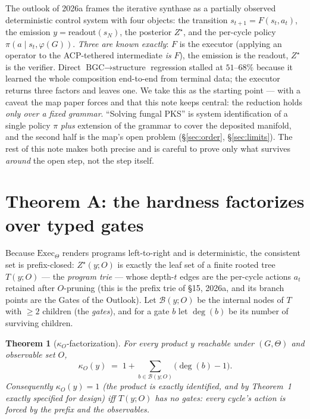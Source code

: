 \documentclass[11pt]{article}
\theoremstyle{plain}
\newtheorem{theorem}{Theorem}
\theoremstyle{definition}
\newcommand{\Exec}{\mathrm{Exec}}
\newcommand{\Zstar}{Z^{\star}}
\newcommand{\kO}{\kappa_{O}}
\newcommand{\Gates}{\mathcal{B}}
\newcommand{\Defn}[1]{\emph{#1}}
\begin{document}
The outlook of 2026a frames the iterative synthase as a partially observed deterministic control system with four objects: the transition $s_{t+1}=F(s_t,a_t)$, the emission $y=\mathrm{readout}(s_N)$, the posterior $\Zstar$, and the per-cycle policy $\pi(a\mid s_t,\varphi(G))$. \emph{Three are known exactly}: $F$ is the executor (applying an operator to the ACP-tethered intermediate \emph{is} $F$), the emission is the readout, $\Zstar$ is the verifier. Direct $\text{BGC}\!\to\!\text{structure}$ regression stalled at $51\text{--}68\%$ because it learned the whole composition end-to-end from terminal data; the executor returns three factors and leaves one. We take this as the starting point --- with a caveat the map paper forces and that this note keeps central: the reduction holds \emph{only over a fixed grammar}. ``Solving fungal PKS'' is system identification of a single policy $\pi$ \emph{plus} extension of the grammar to cover the deposited manifold, and the second half is the map's open problem (\S\ref{sec:order}, \S\ref{sec:limits}). The rest of this note makes both precise and is careful to prove only what survives \emph{around} the open step, not the step itself.

\section{Theorem A: the hardness factorizes over typed gates}
\label{sec:kfac}
Because $\Exec_\Theta$ renders programs left-to-right and is deterministic, the consistent set is prefix-closed: $\Zstar(y;O)$ is exactly the leaf set of a finite rooted tree $T(y;O)$ --- the \Defn{program trie} --- whose depth-$t$ edges are the per-cycle actions $a_t$ retained after $O$-pruning (this is the prefix trie of \S15, 2026a, and its branch points are the Gates of the Outlook). Let $\Gates(y;O)$ be the internal nodes of $T$ with $\geq 2$ children (the \Defn{gates}), and for a gate $b$ let $\deg(b)$ be its number of surviving children.

\begin{theorem}[$\kO$-factorization]\label{thm:kfac}
For every product $y$ reachable under $(G,\Theta)$ and observable set $O$,
\begin{equation}
\kO(y)\;=\;1+\sum_{b\in\Gates(y;O)}\bigl(\deg(b)-1\bigr).
\label{eq:kfac}
\end{equation}
Consequently $\kO(y)=1$ (the product is exactly identified, and by Theorem~1 exactly specified for design) \emph{iff} $T(y;O)$ has no gates: every cycle's action is forced by the prefix and the observables.
\end{theorem}
\end{document}

